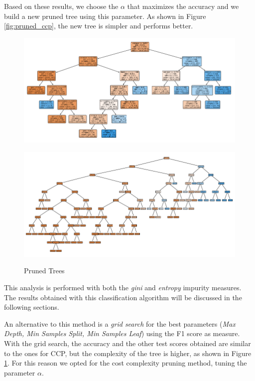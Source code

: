 \documentclass[a4paper,11pt,dvipsnames]{article}
\begin{document}
Based on these results, we choose the $\alpha$ that maximizes the accuracy and we build a new pruned tree using this parameter. As shown in Figure \ref{fig:pruned_ccp}, the new tree is simpler and performs better.

\begin{figure}[h]
\centering
\begin{minipage}{0.49\linewidth}
    \centering
    \includegraphics[width=\textwidth]{pruned_tree_arousal.png}
    \label{fig:pruned_ccp}
    \end{minipage}\hfil
    \begin{minipage}{0.49\linewidth}
    \centering
    \includegraphics[width=\textwidth]{pruned_tree_citraro.png}
    \label{fig:pruned_grid}
    \end{minipage}
    \caption{Pruned Trees}
\end{figure}
This analysis is performed with both the \textit{gini} and \textit{entropy} impurity measures. The results obtained with this classification algorithm will be discussed in the following sections.

An alternative to this method is a \textit{grid search} for the best parameters (\textit{Max Depth, Min Samples Split, Min Samples Leaf}) using the F1 score as measure. With the grid search, the accuracy and the other test scores obtained are similar to the ones for CCP, but the complexity of the tree is higher, as shown in Figure \ref{fig:pruned_grid}. For this reason we opted for the cost complexity pruning method, tuning the parameter $\alpha$.
\end{document}
